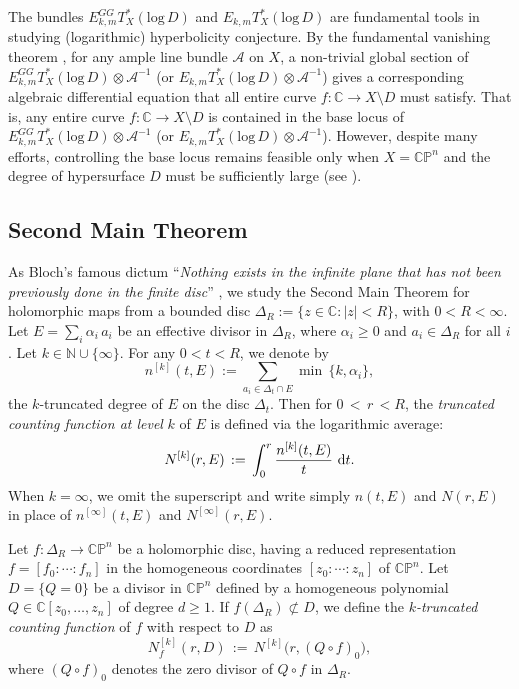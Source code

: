 \documentclass[english, 12pt]{amsart}
\DeclareMathOperator{\dif}{\text{\normalfont d}}
\def\log{\mathrm{log}\,}
\theoremstyle{plain}
\theoremstyle{remark}
\numberwithin{equation}{section}
\theoremstyle{plain}
\theoremstyle{named}
\begin{document}
The bundles $E_{k,m}^{GG}T_X^*(\log D)$ and $E_{k,m}T_X^*(\log D)$ are fundamental tools in studying (logarithmic) hyperbolicity conjecture. By the fundamental vanishing theorem \cite{Demailly97, Siu2015}, for any ample line bundle $\mathcal{A}$ on $X$, a non-trivial global section of $E_{k,m}^{GG}T_X^*(\log D)\otimes\mathcal{A}^{-1}$ (or $E_{k,m}T_X^*(\log D)\otimes\mathcal{A}^{-1}$) gives a corresponding algebraic differential equation that all entire curve $f\colon\mathbb{C}\rightarrow X\setminus D$ must satisfy. That is, any entire curve $f\colon\mathbb{C}\rightarrow X\setminus D$ is contained in the base locus of $E_{k,m}^{GG}T_X^*(\log D)\otimes\mathcal{A}^{-1}$ (or $E_{k,m}T_X^*(\log D)\otimes\mathcal{A}^{-1}$). However, despite many efforts, controlling the base locus remains feasible only when $X=\mathbb{CP}^n$ and the degree of hypersurface $D$ must be sufficiently large (see \cite{Berczi-Kirwan24, Brotbek-Deng19, Demailly20, DMR2010, Siu2015}).
\subsection{Second Main Theorem} 
As Bloch’s famous dictum ``{\it Nothing exists in the infinite plane that has not been previously done in the finite disc}''  \cite{Bloch26}, we study the Second Main Theorem for holomorphic maps from a bounded disc $\Delta_R:=\{z\in\mathbb{C}:|z|<R\}$, with $0<R< \infty$. 
Let $E=\sum\limits_i\alpha_i\,a_i$ be an effective divisor in $\Delta_R$, where $\alpha_i\geq 0$ and $a_i\in\Delta_R$ for all $i$. Let $k\in \mathbb{N}\cup\{\infty\}$. For any $0<t<R$, we denote by
\[
n^{[k]}(t,E)
:=
\sum_{a_i\in\Delta_t\cap E}
\min
\,
\{k,\alpha_i\},
\]
the $k$-truncated degree of $E$ on the disc $\Delta_t$.
Then for $0\,<\,r\,<R$, the \textsl{truncated counting function at level} $k$ of $E$ is defined via the logarithmic average:
\[
N^{[k]}(r,E)
\,
:=
\,
\int_0^r \frac{n^{[k]}(t, E)}{t}\,\dif\! t.
\]
When $k=\infty$, we omit the superscript and write simply $n(t,E)$ and $N(r,E)$ in place of $n^{[\infty]}(t,E)$ and $N^{[\infty]}(r,E)$. 

Let $f\colon\Delta_R\rightarrow \mathbb{C}\mathbb{P}^n$ be a holomorphic disc, having a reduced representation $f=[f_0:\cdots:f_n]$ in the homogeneous coordinates $[z_0:\cdots:z_n]$ of $\mathbb{C}\mathbb{P}^n$. Let $D=\{Q=0\}$ be a divisor in $\mathbb{C}\mathbb{P}^n$ defined by a homogeneous polynomial $Q\in\mathbb{C}[z_0,\dots,z_n]$ of degree $d\geq 1$. If $f(\Delta_R)\not\subset D$, we define the \textsl{$k$-truncated counting function} of $f$ with respect to $D$ as
\[
N_f^{[k]}(r,D)
\,
:=
\,
N^{[k]}\big(r,(Q\circ f)_0\big),
\]
where $(Q\circ f)_0$ denotes the zero divisor of $Q\circ f$ in $\Delta_R$.
\end{document}
